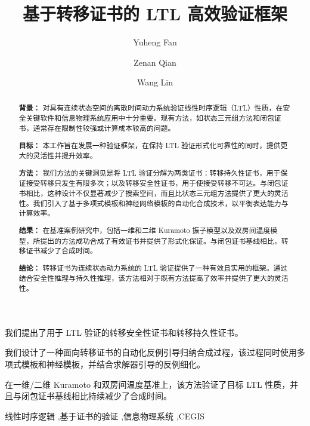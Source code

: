 \documentclass[a4paper,fleqn]{cas-sc}
\theoremstyle{definition}
\begin{document}
\let\WriteBookmarks\relax
\def\floatpagepagefraction{1}
\def\textpagefraction{.001}


\title[mode=title]{基于转移证书的 LTL 高效验证框架}

\author{Yuheng Fan}
\author{Zenan Qian}
\author{Wang Lin}
\cormark[1]



\begin{abstract}
\noindent\textbf{背景：} 对具有连续状态空间的离散时间动力系统验证线性时序逻辑（LTL）性质，在安全关键软件和信息物理系统应用中十分重要。现有方法，如状态三元组方法和闭包证书，通常存在限制性较强或计算成本较高的问题。\par
\noindent\textbf{目标：} 本工作旨在发展一种验证框架，在保持 LTL 验证形式化可靠性的同时，提供更大的灵活性并提升效率。\par
\noindent\textbf{方法：} 我们方法的关键洞见是将 LTL 验证分解为两类证书：转移持久性证书，用于保证接受转移只发生有限多次；以及转移安全性证书，用于使接受转移不可达。与闭包证书相比，这种设计不仅显著减少了搜索空间，而且比状态三元组方法提供了更大的灵活性。我们引入了基于多项式模板和神经网络模板的自动化合成技术，以平衡表达能力与计算效率。\par
\noindent\textbf{结果：} 在基准案例研究中，包括一维和二维 Kuramoto 振子模型以及双房间温度模型，所提出的方法成功合成了有效证书并提供了形式化保证。与闭包证书基线相比，转移证书减少了合成时间。\par
\noindent\textbf{结论：} 转移证书为连续状态动力系统的 LTL 验证提供了一种有效且实用的框架。通过结合安全性推理与持久性推理，该方法相对于既有方法提高了效率并提供了更大的灵活性。
\end{abstract}

\begin{highlights}
\item 我们提出了用于 LTL 验证的转移安全性证书和转移持久性证书。
\item 我们设计了一种面向转移证书的自动化反例引导归纳合成过程，该过程同时使用多项式模板和神经模板，并结合求解器引导的反例细化。
\item 在一维/二维 Kuramoto 和双房间温度基准上，该方法验证了目标 LTL 性质，并且与闭包证书基线相比持续减少了合成时间。
\end{highlights}

\begin{keywords}
线性时序逻辑 \sep 基于证书的验证 \sep 信息物理系统 \sep CEGIS
\end{keywords}

\maketitle











\appendix

\end{document}

